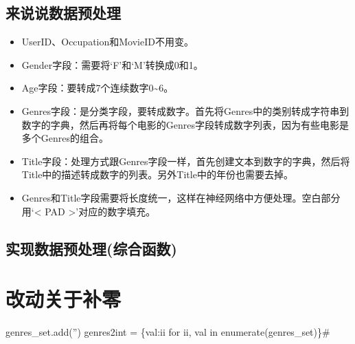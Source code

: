 \documentclass[11pt]{article}
\providecommand{\tightlist}{%
      \setlength{\itemsep}{0pt}\setlength{\parskip}{0pt}}
\begin{document}
    \subsection{来说说数据预处理}\label{ux6765ux8bf4ux8bf4ux6570ux636eux9884ux5904ux7406}

    \begin{itemize}
\tightlist
\item
  UserID、Occupation和MovieID不用变。
\item
  Gender字段：需要将`F'和`M'转换成0和1。
\item
  Age字段：要转成7个连续数字0\textasciitilde{}6。
\item
  Genres字段：是分类字段，要转成数字。首先将Genres中的类别转成字符串到数字的字典，然后再将每个电影的Genres字段转成数字列表，因为有些电影是多个Genres的组合。
\item
  Title字段：处理方式跟Genres字段一样，首先创建文本到数字的字典，然后将Title中的描述转成数字的列表。另外Title中的年份也需要去掉。
\item
  Genres和Title字段需要将长度统一，这样在神经网络中方便处理。空白部分用`\textless{}
  PAD \textgreater{}'对应的数字填充。
\end{itemize}

    \subsection{实现数据预处理(综合函数)}\label{ux5b9eux73b0ux6570ux636eux9884ux5904ux7406ux7efcux5408ux51fdux6570}

    \section{改动关于补零}\label{ux6539ux52a8ux5173ux4e8eux8865ux96f6}

genres\_set.add('') genres2int = \{val:ii for ii, val in
enumerate(genres\_set)\}\#
\end{document}
